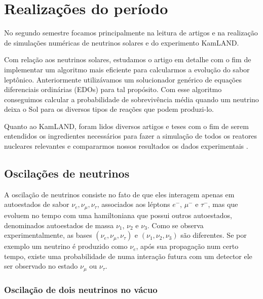 \documentclass[12pt]{report}
\begin{document}
\pagebreak

\chapter{Realizações do período}\label{chp:realizacoes}

No segundo semestre focamos principalmente na leitura de artigos e na realização de simulações numéricas de neutrinos solares e do experimento KamLAND.

Com relação aos neutrinos solares, estudamos o artigo \cite{efficient-nu} em detalhe com o fim de implementar um algoritmo mais eficiente para calcularmos a evolução do sabor leptônico. Anteriormente utilizávamos um solucionador genérico de equações diferenciais ordinárias (EDOs) para tal propósito. Com esse algoritmo conseguimos calcular a probabilidade de sobrevivência média quando um neutrino deixa o Sol para os diversos tipos de reações que podem produzi-lo.

Quanto ao KamLAND, foram lidos diversos artigos e teses \cite{spectral-distortion, yuber, detwiler, juno, refmodel} com o fim de serem entendidos os ingredientes necessários para fazer a simulação de todos os reatores nucleares relevantes \cite{pris-iaea} e compararmos nossos resultados os dados experimentais \cite{spectral-distortion, kamland-data}.

\section{Oscilações de neutrinos} \label{sec:osc}

A oscilação de neutrinos consiste no fato de que eles interagem apenas em autoestados de sabor $\nu_e, \nu_\mu, \nu_\tau$, associados aos léptons $e^-$, $\mu^-$ e $\tau^-$, mas que evoluem no tempo com uma hamiltoniana que possui outros autoestados, denominados autoestados de massa $\nu_1$, $\nu_2$ e $\nu_3$. Como se observa experimentalmente, as bases $(\nu_e, \nu_\mu, \nu_\tau)$ e $(\nu_1, \nu_2, \nu_3)$ são diferentes. Se por exemplo um neutrino é produzido como $\nu_e$, após sua propagação num certo tempo, existe uma probabilidade de numa interação futura com um detector ele ser observado no estado $\nu_\mu$ ou $\nu_\tau$.


\subsection{Oscilação de dois neutrinos no vácuo} \label{sec:2nu-vacuo}
\end{document}
